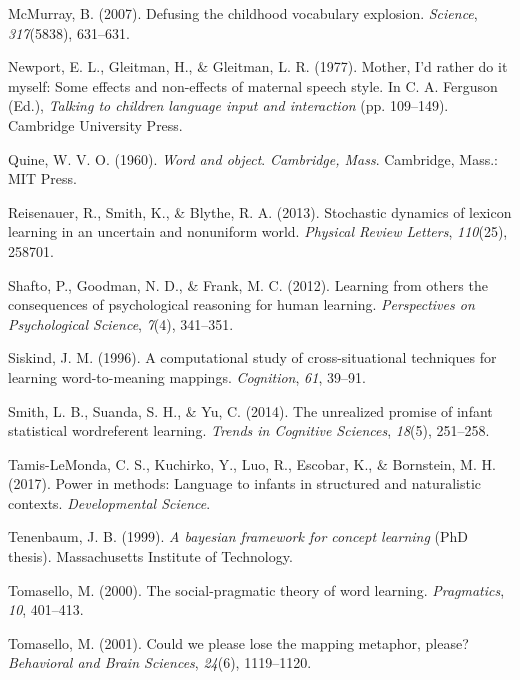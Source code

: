 \documentclass[english,,man,floatsintext]{apa6}
\begin{document}
\leavevmode\hypertarget{ref-mcmurray2007}{}%
McMurray, B. (2007). Defusing the childhood vocabulary explosion. \emph{Science}, \emph{317}(5838), 631--631.

\leavevmode\hypertarget{ref-newport1977}{}%
Newport, E. L., Gleitman, H., \& Gleitman, L. R. (1977). Mother, I'd rather do it myself: Some effects and non-effects of maternal speech style. In C. A. Ferguson (Ed.), \emph{Talking to children language input and interaction} (pp. 109--149). Cambridge University Press.

\leavevmode\hypertarget{ref-quine1960}{}%
Quine, W. V. O. (1960). \emph{Word and object}. \emph{Cambridge, Mass}. Cambridge, Mass.: MIT Press.

\leavevmode\hypertarget{ref-reisenauer2013}{}%
Reisenauer, R., Smith, K., \& Blythe, R. A. (2013). Stochastic dynamics of lexicon learning in an uncertain and nonuniform world. \emph{Physical Review Letters}, \emph{110}(25), 258701.

\leavevmode\hypertarget{ref-shafto2012}{}%
Shafto, P., Goodman, N. D., \& Frank, M. C. (2012). Learning from others the consequences of psychological reasoning for human learning. \emph{Perspectives on Psychological Science}, \emph{7}(4), 341--351.

\leavevmode\hypertarget{ref-siskind1996}{}%
Siskind, J. M. (1996). A computational study of cross-situational techniques for learning word-to-meaning mappings. \emph{Cognition}, \emph{61}, 39--91.

\leavevmode\hypertarget{ref-smith2014}{}%
Smith, L. B., Suanda, S. H., \& Yu, C. (2014). The unrealized promise of infant statistical wordreferent learning. \emph{Trends in Cognitive Sciences}, \emph{18}(5), 251--258.

\leavevmode\hypertarget{ref-tamis-lemonda2017}{}%
Tamis-LeMonda, C. S., Kuchirko, Y., Luo, R., Escobar, K., \& Bornstein, M. H. (2017). Power in methods: Language to infants in structured and naturalistic contexts. \emph{Developmental Science}.

\leavevmode\hypertarget{ref-tenenbaum1999}{}%
Tenenbaum, J. B. (1999). \emph{A bayesian framework for concept learning} (PhD thesis). Massachusetts Institute of Technology.

\leavevmode\hypertarget{ref-tomasello2000}{}%
Tomasello, M. (2000). The social-pragmatic theory of word learning. \emph{Pragmatics}, \emph{10}, 401--413.

\leavevmode\hypertarget{ref-tomasello2001}{}%
Tomasello, M. (2001). Could we please lose the mapping metaphor, please? \emph{Behavioral and Brain Sciences}, \emph{24}(6), 1119--1120.
\end{document}
